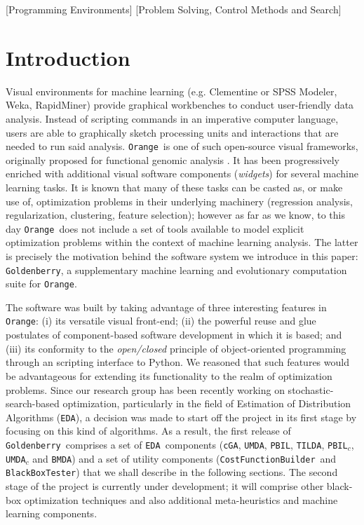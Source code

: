 \documentclass{sig-alternate}
\newcommand{\Orange}{\texttt{Orange}}
\newcommand{\GB}{\texttt{Goldenberry}}
\newcommand{\PBIL}{\texttt{PBIL}}
\newcommand{\UMDA}{\texttt{UMDA}}
\newcommand{\BMDA}{\texttt{BMDA}}
\newcommand{\PBILc}{\texttt{PBIL$_c$}}
\newcommand{\UMDAc}{\texttt{UMDA$_c$}}
\newcommand{\cGA}{\texttt{cGA}}
\newcommand{\EDA}{\texttt{EDA}}
\newcommand{\TILDA}{\texttt{TILDA}}
\newcommand{\CostFunction}{\texttt{CostFunctionBuilder}}
\newcommand{\BBTester}{\texttt{BlackBoxTester}}
\begin{document}
[Programming Environments]
[Problem Solving, Control Methods and Search]


\section{Introduction}
Visual environments for machine learning (e.g. Clementine or SPSS Modeler\cite{ibm2012}, Weka\cite{Hall2009}, RapidMiner\cite{Mierswa2006}) provide graphical workbenches to conduct user-friendly data analysis. Instead of scripting commands in an imperative computer language, users are able to graphically sketch processing units and interactions that are needed to run said analysis. \Orange~is one of such open-source visual frameworks, originally proposed for functional genomic analysis \cite{Curk2005}. It has been progressively enriched with additional visual software components (\textit{widgets}) for several machine learning tasks. It is known that many of these tasks can be casted as, or make use of, optimization problems in their underlying machinery (regression analysis, regularization, clustering, feature selection); however as far as we know, to this day \Orange~does not include a set of tools available to model explicit optimization problems within the context of machine learning analysis. The latter is precisely the motivation behind the software system we introduce in this paper: \mbox{\GB}, a supplementary machine learning and evolutionary computation suite for \Orange.

The software was built by taking advantage of three interesting features in \Orange: (i) its versatile visual front-end; (ii) the powerful reuse and glue postulates of component-based software development in which it is based; and (iii) its conformity to the \textit{open/closed} principle of object-oriented programming through an scripting interface to Python. We reasoned that such features would be advantageous for extending its functionality to the realm of optimization problems. Since our research group has been recently working on stochastic-search-based optimization, particularly in the field of Estimation of Distribution Algorithms (\EDA\cite{Larranaga01, Pelikan06}), a decision was made to start off the project in its first stage by focusing on this kind of algorithms. As a result, the first release of \GB~comprises a set of \EDA~components (\cGA\cite{Harik99}, \UMDA\cite{Muhlenbein97}, \PBIL\cite{Baluja95}, \TILDA\cite{Rojas2012}, \PBILc\cite{Sebag98}, \UMDAc\cite{Larranaga02}  and \BMDA\cite{Pelikan99}) and a set of utility components (\CostFunction~and \BBTester) that we shall describe in the following sections. The second stage of the project is currently under development; it will comprise other black-box optimization techniques and also additional meta-heuristics and machine learning components. 
\end{document}
